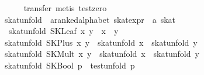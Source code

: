 \begin{isabellebody}
\ \ \ \ \isamarkupfalse%
\ {}transfer{}\ metis\ test{}zero{}\isanewline
{}\isamarkupfalse%
%
\endisatagproof
{\isafoldproof}%
%
\isadelimproof
\isanewline
%
\endisadelimproof
\isanewline
{}\isamarkupfalse%
\ skat{}unfold\ {}{}\ {}{}a{}{}ranked{}alphabet\ skat{}expr\ {}\ {}a\ skat{}\ {}{}{}{}{}{}\ {}{}{}{}{}\ {}{}{}{}\ \isanewline
\ \ {}skat{}unfold\ {}SKLeaf\ x\ y{}\ {}\ x\ {}{}\ y{}\isanewline
{}\ {}skat{}unfold\ {}SKPlus\ x\ y{}\ {}\ skat{}unfold\ x\ {}\ skat{}unfold\ y{}\isanewline
{}\ {}skat{}unfold\ {}SKMult\ x\ y{}\ {}\ skat{}unfold\ x\ {}\ skat{}unfold\ y{}\isanewline
{}\ {}skat{}unfold\ {}SKBool\ p{}\ {}\ test{}unfold\ p{}\isanewline

\end{isabellebody}
